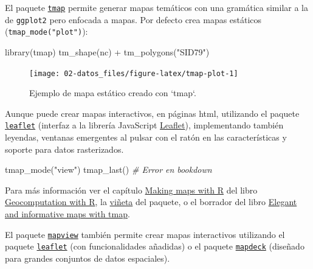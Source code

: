 \documentclass[
  spanish,
]{book}
\newenvironment{Shaded}{\begin{snugshade}}{\end{snugshade}}
\newcommand{\CommentTok}[1]{\textcolor[rgb]{0.56,0.35,0.01}{\textit{#1}}}
\newcommand{\FunctionTok}[1]{\textcolor[rgb]{0.00,0.00,0.00}{#1}}
\newcommand{\NormalTok}[1]{#1}
\newcommand{\SpecialCharTok}[1]{\textcolor[rgb]{0.00,0.00,0.00}{#1}}
\newcommand{\StringTok}[1]{\textcolor[rgb]{0.31,0.60,0.02}{#1}}
\theoremstyle{break}
\begin{document}
El paquete \href{https://r-tmap.github.io/tmap}{\texttt{tmap}} permite generar mapas temáticos con una gramática similar a la de \texttt{ggplot2} pero enfocada a mapas.
Por defecto crea mapas estáticos (\texttt{tmap\_mode("plot")}):

\begin{Shaded}
\begin{Highlighting}[]
\FunctionTok{library}\NormalTok{(tmap)}
\FunctionTok{tm\_shape}\NormalTok{(nc) }\SpecialCharTok{+} \FunctionTok{tm\_polygons}\NormalTok{(}\StringTok{"SID79"}\NormalTok{)}
\end{Highlighting}
\end{Shaded}

\begin{figure}[!htb]

{\centering \texttt{[image: 02-datos\_files/figure-latex/tmap-plot-1]} 

}

\caption{Ejemplo de mapa estático creado con `tmap`.}\label{fig:tmap-plot}
\end{figure}

Aunque puede crear mapas interactivos, en páginas html, utilizando el paquete \href{https://rstudio.github.io/leaflet}{\texttt{leaflet}} (interfaz a la librería JavaScript \href{https://leafletjs.com}{Leaflet}), implementando también leyendas, ventanas emergentes al pulsar con el ratón en las características y soporte para datos rasterizados.

\begin{Shaded}
\begin{Highlighting}[]
\FunctionTok{tmap\_mode}\NormalTok{(}\StringTok{"view"}\NormalTok{)}
\FunctionTok{tmap\_last}\NormalTok{()}
\CommentTok{\# Error en bookdown}
\end{Highlighting}
\end{Shaded}

Para más información ver el capítulo \href{https://geocompr.robinlovelace.net/adv-map.html\#adv-map}{Making maps with R} del libro \href{https://geocompr.robinlovelace.net}{Geocomputation with R}, la \href{https://r-tmap.github.io/tmap/articles/tmap-getstarted.html}{viñeta} del paquete, o el borrador del libro \href{https://r-tmap.github.io}{Elegant and informative maps with tmap}.

El paquete \href{https://r-spatial.github.io/mapview}{\texttt{mapview}} también permite crear mapas interactivos utilizando el paquete \href{https://rstudio.github.io/leaflet}{\texttt{leaflet}} (con funcionalidades añadidas) o el paquete \href{https://symbolixau.github.io/mapdeck}{\texttt{mapdeck}} (diseñado para grandes conjuntos de datos espaciales).
\end{document}
